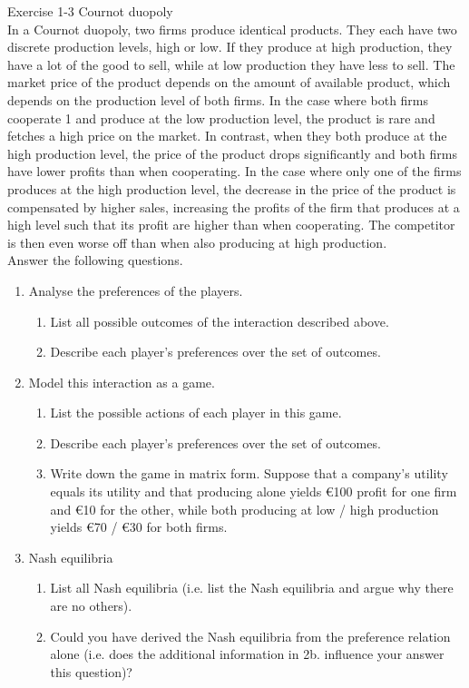 \documentclass[../main.tex]{subfiles}
\begin{document}
\begin{question}
Exercise 1-3 Cournot duopoly\\
In a Cournot duopoly, two firms produce identical products. They each have two discrete production levels, high or low. If they produce at high production, they have a lot of the good to sell, while at low production they have less to sell. The market price of the product depends on the amount of available product, which depends on the production level of both firms. In the case where both firms cooperate 1 and produce at the low production level, the product is rare and fetches a high price on the market. In contrast, when they both produce at the high production level, the price of the product drops significantly and both firms have lower profits than when cooperating. In the case where only one of the firms produces at the high production level, the decrease in the price of the product is compensated by higher sales, increasing the profits of the firm that produces at a high level such that its profit are higher than when cooperating. The competitor is then even worse off than when also producing at high production.\\

Answer the following questions.
\begin{enumerate}
	\item Analyse the preferences of the players.
	\begin{enumerate}
		\item List all possible outcomes of the interaction described above.
		\item Describe each player’s preferences over the set of outcomes.
	\end{enumerate}
	\item Model this interaction as a game.
	\begin{enumerate}
		\item List the possible actions of each player in this game.
		\item Describe each player’s preferences over the set of outcomes.
		\item Write down the game in matrix form. Suppose that a company’s utility equals its utility and that producing alone yields \euro 100 profit for one firm and \euro10 for the other, while both producing at low / high production yields \euro70 / \euro30 for both firms.
	\end{enumerate}
	
	\item Nash equilibria
	\begin{enumerate}
		\item List all Nash equilibria (i.e. list the Nash equilibria and argue why there are no others). 
		\item Could you have derived the Nash equilibria from the preference relation alone (i.e. does the additional information in 2b. influence your answer this question)?
	\end{enumerate}
	

\end{enumerate}
\end{question}
\end{document}
